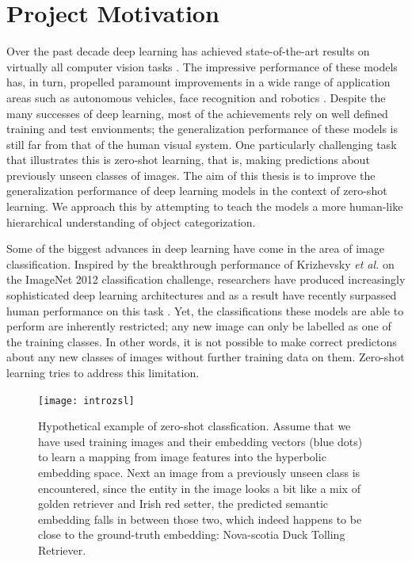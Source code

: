 \documentclass[12pt]{report}
\begin{document}
\section{Project Motivation}
Over the past decade deep learning has achieved state-of-the-art results on virtually all computer vision tasks \cite{Goodfellow2016}. The impressive performance of these models has, in turn, propelled paramount improvements in a wide range of application areas such as autonomous vehicles\cite{Bojarski2016}, face recognition \cite{Taigman2014} and robotics \cite{Finn2015}\cite{Ganegedara2017}. Despite the many successes of deep learning, most of the achievements rely on well defined training and test envionments; the generalization performance of these models is still far from that of the human visual system. One particularly challenging task that illustrates this is zero-shot learning, that is, making predictions about previously unseen classes of images. The aim of this thesis is to improve the generalization performance of deep learning models in the context of zero-shot learning. We approach this by attempting to teach the models a more human-like hierarchical understanding of object categorization.

Some of the biggest advances in deep learning have come in the area of image classification. Inspired by the breakthrough performance of Krizhevsky \textit{et al.} \cite{Krizhevsky2012} on the ImageNet 2012 classification challenge, researchers have produced increasingly sophisticated deep learning architectures and as a result have recently surpassed human performance on this task \cite{Dodge2017}. Yet, the classifications these models are able to perform are inherently restricted; any new image can only be labelled as one of the training classes. In other words, it is not possible to make correct predictons about any new classes of images without further training data on them. Zero-shot learning \cite{Palatucci2009} tries to address this limitation.

\begin{figure}
  \centering
	\texttt{[image: introzsl]}
	\caption{Hypothetical example of zero-shot classfication. Assume that we have used training images and their embedding vectors (blue dots) to learn a mapping from image features into the hyperbolic embedding space. Next an image from a previously unseen class is encountered, since the entity in the image looks a bit like a mix of golden retriever and Irish red setter, the predicted semantic embedding falls in between those two, which indeed happens to be close to the ground-truth embedding: Nova-scotia Duck Tolling Retriever.}
	\label{fig:intro}
\end{figure}
\end{document}
